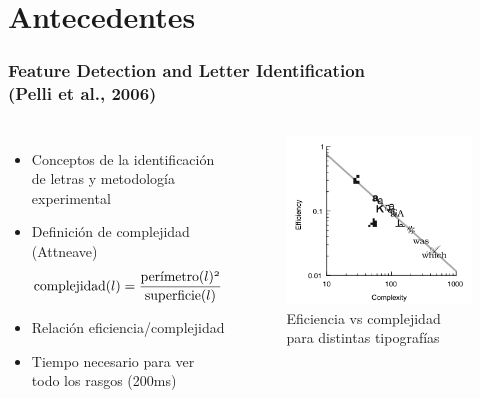 \documentclass[10pt]{beamer}
\begin{document}
  \section{Antecedentes}
	\begin{frame}
	\frametitle{Feature Detection and Letter Identification\\(Pelli et al., 2006)}
	\begin{columns}[t]
	\begin{itemize}
		\item Conceptos de la identificación de letras y metodología experimental\pause
		\item Definición de complejidad (Attneave)
		  \begin{equation*}
		   \mathnormal{\text{complejidad}(l) = \frac{\text{per\'imetro}(l)^2}{\text{superficie}(l)}}
		  \end{equation*}\pause
		\item Relación eficiencia/complejidad
		\item Tiempo necesario para ver todo los rasgos (200ms) 
	\end{itemize}


	\begin{figure}
	\includegraphics[width=\textwidth]{graficos/pelli4.png}
	\caption{Eficiencia vs complejidad para distintas tipografías}
	\end{figure}
	\end{columns}
  \end{frame}
\end{document}
